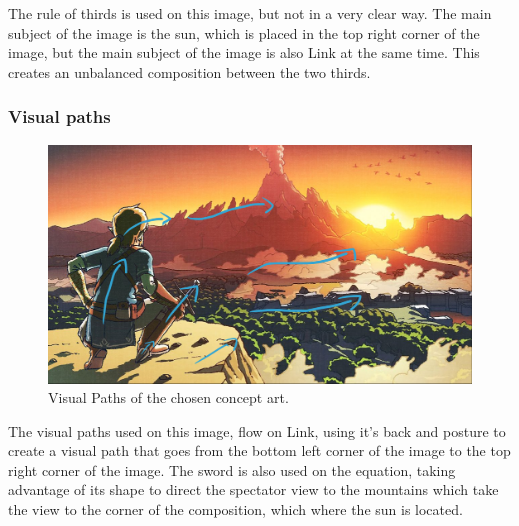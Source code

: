 \documentclass{cup-pan}
\begin{document}
                The rule of thirds is used on this image, but not in a very clear way. 
                The main subject of the image is the sun, which is placed in the top right corner of the image, but the main subject of the image is also Link at the same time.
                This creates an unbalanced composition between the two thirds.\\

            \subsubsection{Visual paths} \label{visualpaths}
                \begin{figure}[H]
                    \includegraphics[width=\textwidth]{Imagenes/Referencias/Analisis_ConceptArt/recorridovisual.png}
                    \caption{Visual Paths of the chosen concept art.}
                \end{figure}

                The visual paths used on this image, flow on Link, using it's back and posture to create a visual path that goes from the bottom left corner of the image to the top right corner of the image.
                The sword is also used on the equation, taking advantage of its shape to direct the spectator view to the mountains which take the view to the corner of the composition, which where the sun is located. \\
\end{document}
